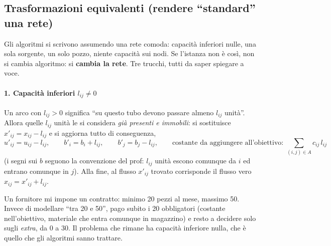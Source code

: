 \documentclass[12pt]{extarticle} %
\begin{document}
\subsection{Trasformazioni equivalenti (rendere ``standard'' una rete)}
Gli algoritmi si scrivono assumendo una rete comoda: capacità inferiori nulle, una sola sorgente, un solo pozzo, niente capacità sui nodi. Se l'istanza non è così, non si cambia algoritmo: si \textbf{cambia la rete}. Tre trucchi, tutti da saper spiegare a voce.

\paragraph{1. Capacità inferiori $l_{ij} \neq 0$}
Un arco con $l_{ij} > 0$ significa ``su questo tubo devono passare almeno $l_{ij}$ unità''. Allora quelle $l_{ij}$ unità le si considera \emph{già presenti e immobili}: si sostituisce $x'_{ij} = x_{ij} - l_{ij}$ e si aggiorna tutto di conseguenza,
\[
u'_{ij} = u_{ij} - l_{ij}, \qquad b'_i = b_i + l_{ij}, \qquad b'_j = b_j - l_{ij},
\qquad \text{costante da aggiungere all'obiettivo: } \sum_{(i,j)\in A} c_{ij}\,l_{ij}
\]
(i segni sui $b$ seguono la convenzione del prof: $l_{ij}$ unità escono comunque da $i$ ed entrano comunque in $j$). Alla fine, al flusso $x'_{ij}$ trovato corrisponde il flusso vero $x_{ij} = x'_{ij} + l_{ij}$.

\begin{tcolorbox}[colback=green!4, colframe=green!45!black, title=\textbf{Esempio personale: l'abbonamento}]
Un fornitore mi impone un contratto: minimo 20 pezzi al mese, massimo 50. Invece di modellare ``tra 20 e 50'', pago subito i 20 obbligatori (costante nell'obiettivo, materiale che entra comunque in magazzino) e resto a decidere solo sugli \emph{extra}, da 0 a 30. Il problema che rimane ha capacità inferiore nulla, che è quello che gli algoritmi sanno trattare.
\end{tcolorbox}
\end{document}
